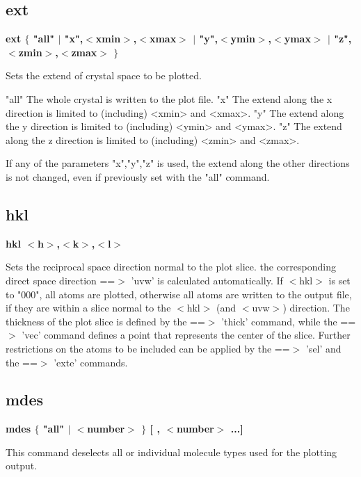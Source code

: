 \subsection*{ext}
{\bf ext $ \{$ "all" $| $ "x",$ <$xmin$> $,$ <$xmax$> $ $| $ "y",$ <$ymin$> $,$ <$ymax$> $ $| $ "z",$ <$zmin$> $,$ <$zmax$> $ $\} $ \par }
\par
\vspace{3pt}
Sets the extend of crystal space to be plotted. 
\par
\begin{MacVerbatim}
"all"   The whole crystal is written to the plot file.
"x"     The extend along the x direction is limited to (including)
        <xmin> and <xmax>.
"y"     The extend along the y direction is limited to (including)
        <ymin> and <ymax>.
"z"     The extend along the z direction is limited to (including)
        <zmin> and <zmax>.
\end{MacVerbatim}
If any of the parameters "x","y","z" is used, the extend along the 
other directions is not changed, even if previously set with the "all" 
command. 
\subsection*{hkl}
{\bf hkl $ <$h$> $,$ <$k$> $,$ <$l$> $ \par }
\par
\vspace{3pt}
Sets the reciprocal space direction normal to the plot slice. the 
corresponding direct space direction ==$> $ 'uvw' is calculated 
automatically. 
If $ <$hkl$> $ is set to "000", all atoms are plotted, otherwise all 
atoms are written to the output file, if they are within a slice 
normal to the $ <$hkl$> $ (and $ <$uvw$> $) direction. The thickness of the plot 
slice is defined by the ==$> $ 'thick' command, while the ==$> $ 'vec' command 
defines a point that represents the center of the slice. 
Further restrictions on the atoms to be included can be applied by 
the ==$> $ 'sel' and the ==$> $ 'exte' commands. 
\subsection*{mdes}
{\bf mdes $ \{$ "all" $| $ $ <$number$> $ $\} $ [ , $ <$number$> $ ...] \par }
\par
\vspace{3pt}
This command deselects all or individual molecule types used for 
the plotting output. 
